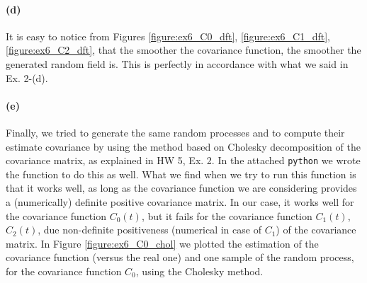\documentclass[a4paper,11pt]{article}
\theoremstyle{definition}
\theoremstyle{plain}
\theoremstyle{remark}
\begin{document}
\paragraph*{(d)} It is easy to notice from Figures \ref{figure:ex6_C0_dft}, \ref{figure:ex6_C1_dft},  \ref{figure:ex6_C2_dft}, that the smoother the covariance function, the smoother the generated random field is. This is perfectly in accordance with what we said in Ex. 2-(d).

\paragraph*{(e)} Finally, we tried to generate the same random processes and to compute their estimate covariance by using the method based on Cholesky decomposition of the covariance matrix, as explained in HW 5, Ex. 2. In the attached \texttt{python} we wrote the function to do this as well. What we find when we try to run this function is that it works well, as long as the covariance function we are considering provides a (numerically) definite positive covariance matrix. In our case, it works well for the covariance function $C_0(t)$, but it fails for the covariance function $C_1(t)$, $C_2(t)$, due non-definite positiveness (numerical in case of $C_1$) of the covariance matrix.
In Figure \ref{figure:ex6_C0_chol} we plotted the estimation of the covariance function (versus the real one) and one sample of the random process, for the covariance function $C_0$, using the Cholesky method. 
\end{document}
